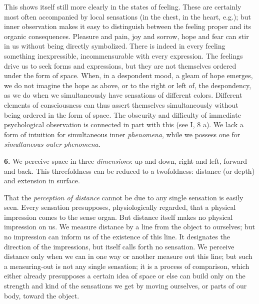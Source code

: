 \documentclass[12pt,a4paper]{book}
\newcommand{\opage}[1]{\marginnote{\footnotesize\textit{[#1]}}}
\begin{document}
This shows itself still more clearly in the states of feeling. These are
certainly most often accompanied by local sensations (in the chest, in
the heart, e.g.); but inner observation makes it easy to distinguish
between the feeling proper and its organic consequences. Pleasure and
pain, joy and sorrow, hope and fear can stir in us without being directly
symbolized. There is indeed in every feeling something inexpressible,
incommensurable with every expression. The feelings drive us to seek
forms and expressions, but they are not themselves ordered under the form
of space. When, in a despondent mood, a gleam of hope emerges, we do not
imagine the hope as above, or to the right or left of, the despondency,
as we do when we simultaneously have sensations of different colors.
Different elements of consciousness can thus assert themselves
simultaneously without being ordered in the form of space. The obscurity
and difficulty of immediate psychological observation is connected in
part with this (see I, 8 a). We lack a form of intuition for
simultaneous inner \emph{phenomena}, while we possess one for
\emph{simultaneous outer phenomena}.

\textbf{6.} We perceive space in three \emph{dimensions}: up and down,
right and left, forward and back. This threefoldness can be reduced to a
twofoldness: distance (or depth) and extension in surface.


\opage{237}That the \emph{perception of distance} cannot be due to any
single sensation is easily seen. Every sensation presupposes,
physiologically regarded, that a physical impression comes to the sense
organ. But distance itself makes no physical impression on us. We
measure distance by a line from the object to ourselves; but no
impression can inform us of the existence of this line. It designates
the direction of the impressions, but itself calls forth no sensation.
We perceive distance only when we can in one way or another measure out
this line; but such a measuring-out is not any single sensation; it is a
process of comparison, which either already presupposes a certain idea of
space or else can build only on the strength and kind of the sensations
we get by moving ourselves, or parts of our body, toward the object.
\end{document}
